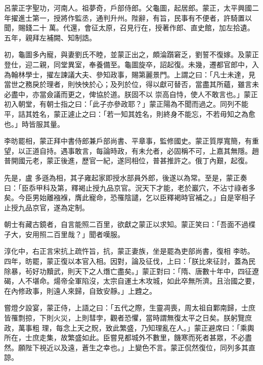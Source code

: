 \begin{pinyinscope}
 呂蒙正字聖功，河南人。祖夢奇，戶部侍郎。父龜圖，起居郎。蒙正，太平興國二年擢進士第一，授將作監丞，通判升州。陛辭，有旨，民事有不便者，許騎置以聞，賜錢二十
 萬。代還，會征太原，召見行在，授著作郎、直史館，加左拾遺。五年，親拜左補闕、知制誥。



 初，龜圖多內寵，與妻劉氏不睦，並蒙正出之，頗淪躓窘乏，劉誓不復嫁。及蒙正登仕，迎二親，同堂異室，奉養備至。龜圖旋卒，詔起復。未幾，遷都官郎中，入為翰林學士，擢左諫議大夫、參知政事，賜第麗景門。上謂之曰：「凡士未達，見當世之務戾於理者，則怏怏於心；及列於位，得以獻可替否，當盡其所蘊，雖言未必盡中，亦當僉議而更之，俾協於道。朕固不以
 崇高自恃，使人不敢言也。」蒙正初入朝堂，有朝士指之曰：「此子亦參政耶？」蒙正陽為不聞而過之。同列不能平，詰其姓名，蒙正遽止之曰：「若一知其姓名，則終身不能忘，不若毋知之為愈也。」時皆服其量。



 李昉罷相，蒙正拜中書侍郎兼戶部尚書、平章事，監修國史。蒙正質厚寬簡，有重望，以正道自持。遇事敢言，每論時政，有未允者，必固稱不可，上嘉其無隱。趙普開國元老，蒙正後進，歷官一紀，遂同相位，普甚推許之。俄丁內艱，起復。



 先是，盧
 多遜為相，其子雍起家即授水部員外郎，後遂以為常。至是，蒙正奏曰：「臣忝甲科及第，釋褐止授九品京官。況天下才能，老於巖穴，不沾寸祿者多矣。今臣男始離襁褓，膺此寵命，恐罹陰譴，乞以臣釋褐時官補之。」自是宰相子止授九品京官，遂為定制。



 朝士有藏古鏡者，自言能照二百里，欲獻之蒙正以求知。蒙正笑曰：「吾面不過楪子大，安用照二百里哉？」聞者嘆服。



 淳化中，右正言宋抗上疏忤旨，抗，蒙正妻族，坐是罷為吏部尚書，復相
 李昉。四年，昉罷，蒙正復以本官入相。因對，論及征伐，上曰：「朕比來征討，蓋為民除暴，茍好功黷武，則天下之人熸亡盡矣。」蒙正對曰：「隋、唐數十年中，四征遼碣，人不堪命。煬帝全軍陷沒，太宗自運土木攻城，如此卒無所濟。且治國之要，在內修政事，則遠人來歸，自致安靜。」上韙之。



 嘗燈夕設宴，蒙正侍，上語之曰：「五代之際，生靈凋喪，周太祖自鄴南歸，士庶皆罹剽掠，下則火災，上則彗孛，觀者恐懼，當時謂無復太平之日矣。朕躬覽庶政，萬事粗
 理，每念上天之貺，致此繁盛，乃知理亂在人。」蒙正避席曰：「乘輿所在，士庶走集，故繁盛如此。臣嘗見都城外不數里，饑寒而死者甚眾，不必盡然。願陛下視近以及遠，蒼生之幸也。」上變色不言。蒙正侃然復位，同列多其直諒。




\end{pinyinscope}
